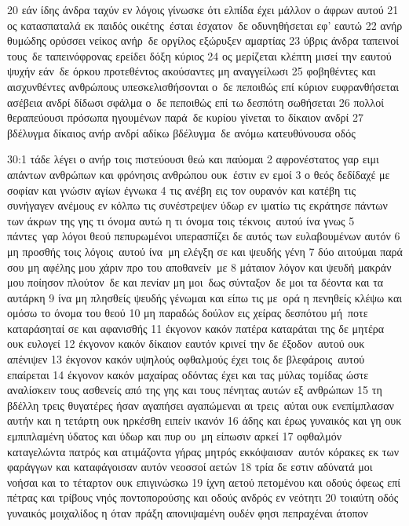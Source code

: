 \documentclass[10pt,oneside,footinclude=true,headinclude=true]{scrbook} %
\begin{document}
20 εάν ίδης άνδρα ταχύν εν λόγοις γίνωσκε ότι ελπίδα έχει μάλλον ο άφρων αυτού
21 ος κατασπαταλά εκ παιδός οικέτης έσται έσχατον δε οδυνηθήσεται εφ' εαυτώ
22 ανήρ θυμώδης ορύσσει νείκος ανήρ δε οργίλος εξώρυξεν αμαρτίας
23 ύβρις άνδρα ταπεινοί τους δε ταπεινόφρονας ερείδει δόξη κύριος
24 ος μερίζεται κλέπτη μισεί την εαυτού ψυχήν εάν δε όρκου προτεθέντος ακούσαντες μη αναγγείλωσι
25 φοβηθέντες και αισχυνθέντες ανθρώπους υπεσκελισθήσονται ο δε πεποιθώς επί κύριον ευφρανθήσεται ασέβεια ανδρί δίδωσι σφάλμα ο δε πεποιθώς επί τω δεσπότη σωθήσεται
26 πολλοί θεραπεύουσι πρόσωπα ηγουμένων παρά δε κυρίου γίνεται το δίκαιον ανδρί
27 βδέλυγμα δίκαιος ανήρ ανδρί αδίκω βδέλυγμα δε ανόμω κατευθύνουσα οδός
\par
30:1 τάδε λέγει ο ανήρ τοις πιστεύουσι θεώ και παύομαι
2 αφρονέστατος γαρ ειμι απάντων ανθρώπων και φρόνησις ανθρώπου ουκ έστιν εν εμοί
3 ο θεός δεδίδαχέ με σοφίαν και γνώσιν αγίων έγνωκα
4 τις ανέβη εις τον ουρανόν και κατέβη τις συνήγαγεν ανέμους εν κόλπω τις συνέστρεψεν ύδωρ εν ιματίω τις εκράτησε πάντων των άκρων της γης τι όνομα αυτώ η τι όνομα τοις τέκνοις αυτού ίνα γνως
5 πάντες γαρ λόγοι θεού πεπυρωμένοι υπερασπίζει δε αυτός των ευλαβουμένων αυτόν
6 μη προσθής τοις λόγοις αυτού ίνα μη ελέγξη σε και ψευδής γένη
7 δύο αιτούμαι παρά σου μη αφέλης μου χάριν προ του αποθανείν με
8 μάταιον λόγον και ψευδή μακράν μου ποίησον πλούτον δε και πενίαν μη μοι δως σύνταξον δε μοι τα δέοντα και τα αυτάρκη
9 ίνα μη πλησθείς ψευδής γένωμαι και είπω τις με ορά η πενηθείς κλέψω και ομόσω το όνομα του θεού
10 μη παραδώς δούλον εις χείρας δεσπότου μή ποτε καταράσηταί σε και αφανισθής
11 έκγονον κακόν πατέρα καταράται της δε μητέρα ουκ ευλογεί
12 έκγονον κακόν δίκαιον εαυτόν κρινεί την δε έξοδον αυτού ουκ απένιψεν
13 έκγονον κακόν υψηλούς οφθαλμούς έχει τοις δε βλεφάροις αυτού επαίρεται
14 έκγονον κακόν μαχαίρας οδόντας έχει και τας μύλας τομίδας ώστε αναλίσκειν τους ασθενείς από της γης και τους πένητας αυτών εξ ανθρώπων
15 τη βδέλλη τρεις θυγατέρες ήσαν αγαπήσει αγαπώμεναι αι τρεις αύται ουκ ενεπίμπλασαν αυτήν και η τετάρτη ουκ ηρκέσθη ειπείν ικανόν
16 άδης και έρως γυναικός και γη ουκ εμπιπλαμένη ύδατος και ύδωρ και πυρ ου μη είπωσιν αρκεί
17 οφθαλμόν καταγελώντα πατρός και ατιμάζοντα γήρας μητρός εκκόψαισαν αυτόν κόρακες εκ των φαράγγων και καταφάγοισαν αυτόν νεοσσοί αετών
18 τρία δε εστιν αδύνατά μοι νοήσαι και το τέταρτον ουκ επιγινώσκω
19 ίχνη αετού πετομένου και οδούς όφεως επί πέτρας και τρίβους νηός ποντοπορούσης και οδούς ανδρός εν νεότητι
20 τοιαύτη οδός γυναικός μοιχαλίδος η όταν πράξη απονιψαμένη ουδέν φησι πεπραχέναι άτοπον
\end{document}
